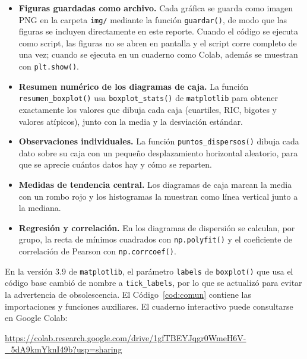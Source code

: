 \documentclass[11pt,letterpaper]{article}
\begin{document}
\begin{itemize}
    \item \textbf{Figuras guardadas como archivo.} Cada gráfica se guarda como imagen PNG en la carpeta \texttt{img/} mediante la función \texttt{guardar()}, de modo que las figuras se incluyen directamente en este reporte. Cuando el código se ejecuta como script, las figuras no se abren en pantalla y el script corre completo de una vez; cuando se ejecuta en un cuaderno como Colab, además se muestran con \texttt{plt.show()}.
    \item \textbf{Resumen numérico de los diagramas de caja.} La función \texttt{resumen\_boxplot()} usa \texttt{boxplot\_stats()} de \texttt{matplotlib} para obtener exactamente los valores que dibuja cada caja (cuartiles, RIC, bigotes y valores atípicos), junto con la media y la desviación estándar.
    \item \textbf{Observaciones individuales.} La función \texttt{puntos\_dispersos()} dibuja cada dato sobre su caja con un pequeño desplazamiento horizontal aleatorio, para que se aprecie cuántos datos hay y cómo se reparten.
    \item \textbf{Medidas de tendencia central.} Los diagramas de caja marcan la media con un rombo rojo y los histogramas la muestran como línea vertical junto a la mediana.
    \item \textbf{Regresión y correlación.} En los diagramas de dispersión se calculan, por grupo, la recta de mínimos cuadrados con \texttt{np.polyfit()} y el coeficiente de correlación de Pearson con \texttt{np.corrcoef()}.
\end{itemize}

En la versión 3.9 de \texttt{matplotlib}, el parámetro \texttt{labels} de \texttt{boxplot()} que usa el código base cambió de nombre a \texttt{tick\_labels}, por lo que se actualizó para evitar la advertencia de obsolescencia. El Código~\ref{cod:comun} contiene las importaciones y funciones auxiliares. El cuaderno interactivo puede consultarse en Google Colab:

\begin{center}
    \url{https://colab.research.google.com/drive/1gfTBEYJqgr0WmeH6V-_5dA9kmYknI49b?usp=sharing}
\end{center}
\end{document}

